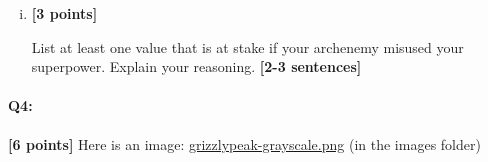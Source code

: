 \documentclass[11pt]{article}
\begin{document}
\begin{enumerate}[(a)]
\begin{enumerate}[(i)]
\begin{tcolorbox}[colback=white!5!white,colframe=green!75!black]
{{            
            }}
    \end{tcolorbox}
    \item \textbf{[3 points]}
    \begin{tcolorbox}[colback=orange!5!white,colframe=orange!75!black]
    
    List at least one value that is at stake if your archenemy misused your superpower. Explain your reasoning. \textbf{[2-3 sentences]}
    \end{tcolorbox}
    
    
    \end{enumerate}

\end{enumerate}



\pagebreak
\paragraph{Q4:} \textbf{[6 points]} Here is an image: \href{run:images/grizzlypeak-grayscale.png}{grizzlypeak-grayscale.png} (in the images folder)
\end{document}
